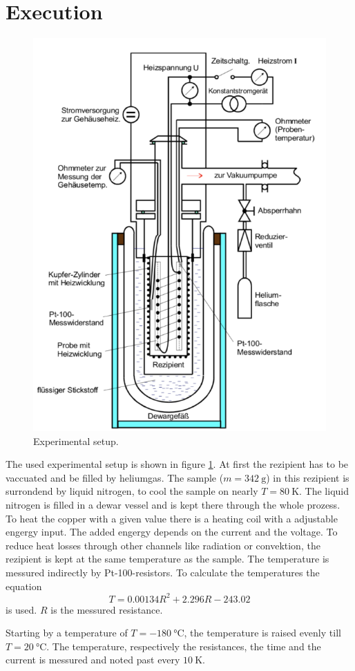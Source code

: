 \section{Execution}
\label{sec:Durchführung}

\begin{figure}
    \centering 
    \includegraphics[width=.8\textwidth]{Bilder/Aufbau.PNG}
    \caption{Experimental setup. \cite{V47}}
    \label{fig:Aufbau}
\end{figure}


The used experimental setup is shown in figure \ref{fig:Aufbau}.
At first the rezipient has to be vaccuated and be filled by heliumgas.
The sample ($m=\SI{342}{\g}$) in this rezipient is surrondend by liquid nitrogen, to cool the sample on nearly $T=\SI{80}{\kelvin}$. 
The liquid nitrogen is filled in a dewar vessel and is kept there through the whole prozess.
To heat the copper with a given value there is a heating coil with a adjustable engergy input.
The added engergy depends on the current and the voltage.
To reduce heat losses through other channels like radiation or convektion, the rezipient is kept at the same temperature as the sample.
The temperature is messured indirectly by Pt-100-resistors.
To calculate the temperatures the equation
\begin{equation}
    T = 0.00134 R^2 + 2.296 R - 243.02
\end{equation}
is used.
$R$ is the messured resistance.




Starting by a temperature of $T=\SI{-180}{\celsius}$, the temperature is raised evenly till $T=\SI{20}{\celsius}$. 
The temperature, respectively the resistances, the time and the current is messured and noted past every $\SI{10}{\kelvin}$.
